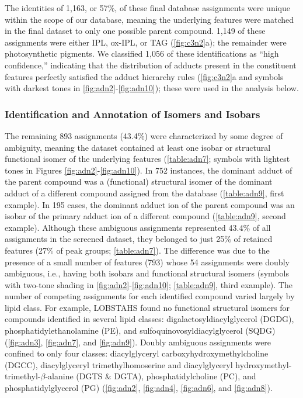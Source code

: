 The identities of 1,163, or 57\%, of these final database assignments were unique within the scope of our database, meaning the underlying features were matched in the final dataset to only one possible parent compound. 1,149 of these assignments were either IPL, ox-IPL, or TAG (\autoref{fig:c3n2}a); the remainder were photosynthetic pigments. We classified 1,056 of these identifications as ``high confidence,'' indicating that the distribution of adducts present in the constituent features perfectly satisfied the adduct hierarchy rules (\autoref{fig:c3n2}a and symbols with darkest tones in \autoref{fig:adn2}-\autoref{fig:adn10}); these were used in the analysis below.

\subsubsection{Identification and Annotation of Isomers and Isobars}

The remaining 893 assignments (43.4\%) were characterized by some degree of ambiguity, meaning the dataset contained at least one isobar or structural functional isomer of the underlying features (\autoref{table:adn7}; symbols with lightest tones in Figures \autoref{fig:adn2}-\autoref{fig:adn10}). In 752 instances, the dominant adduct of the parent compound was a (functional) structural isomer of the dominant adduct of a different compound assigned from the database (\autoref{table:adn9}, first example). In 195 cases, the dominant adduct ion of the parent compound was an isobar of the primary adduct ion of a different compound (\autoref{table:adn9}, second example). Although these ambiguous assignments represented 43.4\% of all assignments in the screened dataset, they belonged to just 25\% of retained features (27\% of peak groups; \autoref{table:adn7}). The difference was due to the presence of a small number of features (793) whose 54 assignments were doubly ambiguous, i.e., having both isobars and functional structural isomers (symbols with two-tone shading in \autoref{fig:adn2}-\autoref{fig:adn10}; \autoref{table:adn9}, third example). The number of competing assignments for each identified compound varied largely by lipid class. For example, LOBSTAHS found no functional structural isomers for compounds identified in several lipid classes: digalactosyldiacylglycerol (DGDG), phosphatidylethanolamine (PE), and sulfoquinovosyldiacylglycerol (SQDG) (\autoref{fig:adn3}, \autoref{fig:adn7}, and \autoref{fig:adn9}). Doubly ambiguous assignments were confined to only four classes: diacylglyceryl carboxyhydroxymethylcholine (DGCC), diacylglyceryl trimethylhomoserine and diacylglyceryl hydroxymethyl-trimethyl-$\beta$-alanine (DGTS \& DGTA), phosphatidylcholine (PC), and phosphatidylglycerol (PG) (\autoref{fig:adn2}, \autoref{fig:adn4}, \autoref{fig:adn6}, and \autoref{fig:adn8}).

